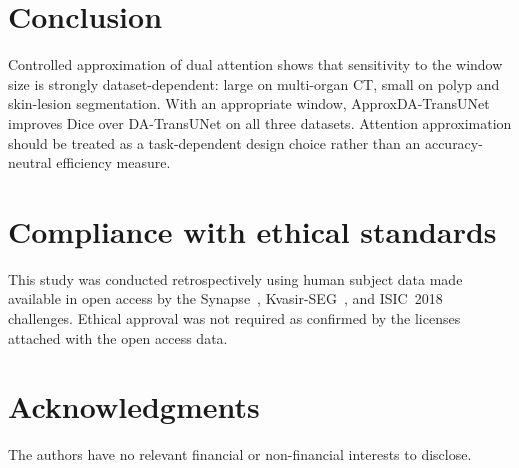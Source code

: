 \section{Conclusion}
\label{sec:conclusion}

Controlled approximation of dual attention shows that sensitivity to the window size is strongly dataset-dependent: large on multi-organ CT, small on polyp and skin-lesion segmentation. With an appropriate window, ApproxDA-TransUNet improves Dice over DA-TransUNet on all three datasets. Attention approximation should be treated as a task-dependent design choice rather than an accuracy-neutral efficiency measure.

\section{Compliance with ethical standards}
\label{sec:ethics}

This study was conducted retrospectively using human subject data made available in open access by the Synapse~\cite{landman2015miccai}, Kvasir-SEG~\cite{jha2020kvasir}, and ISIC~2018~\cite{codella2019isic} challenges. Ethical approval was not required as confirmed by the licenses attached with the open access data.

\section{Acknowledgments}
\label{sec:acknowledgments}

 The authors have no relevant financial or non-financial interests to disclose.
